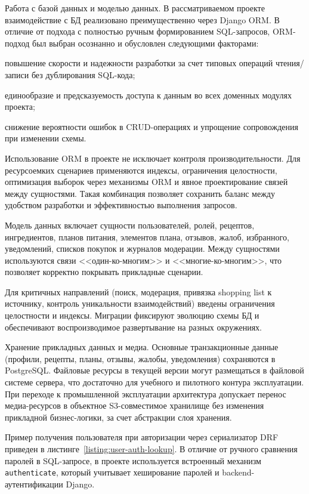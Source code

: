 Работа с базой данных и моделью данных. В рассматриваемом проекте взаимодействие с БД реализовано преимущественно через Django ORM. В отличие от подхода с полностью ручным формированием SQL-запросов, ORM-подход был выбран осознанно и обусловлен следующими факторами:
\begin{compactlist}
  \item повышение скорости и надежности разработки за счет типовых операций чтения/записи без дублирования SQL-кода;
  \item единообразие и предсказуемость доступа к данным во всех доменных модулях проекта;
  \item снижение вероятности ошибок в CRUD-операциях и упрощение сопровождения при изменении схемы.
\end{compactlist}

Использование ORM в проекте не исключает контроля производительности. Для ресурсоемких сценариев применяются индексы, ограничения целостности, оптимизация выборок через механизмы ORM и явное проектирование связей между сущностями. Такая комбинация позволяет сохранить баланс между удобством разработки и эффективностью выполнения запросов.

Модель данных включает сущности пользователей, ролей, рецептов, ингредиентов, планов питания, элементов плана, отзывов, жалоб, избранного, уведомлений, списков покупок и журналов модерации. Между сущностями используются связи <<один-ко-многим>> и <<многие-ко-многим>>, что позволяет корректно покрывать прикладные сценарии.

Для критичных направлений (поиск, модерация, привязка shopping list к источнику, контроль уникальности взаимодействий) введены ограничения целостности и индексы. Миграции фиксируют эволюцию схемы БД и обеспечивают воспроизводимое развертывание на разных окружениях.

Хранение прикладных данных и медиа. Основные транзакционные данные (профили, рецепты, планы, отзывы, жалобы, уведомления) сохраняются в PostgreSQL. Файловые ресурсы в текущей версии могут размещаться в файловой системе сервера, что достаточно для учебного и пилотного контура эксплуатации. При переходе к промышленной эксплуатации архитектура допускает перенос медиа-ресурсов в объектное S3-совместимое хранилище без изменения прикладной бизнес-логики, за счет абстракции слоя хранения.

Пример получения пользователя при авторизации через сериализатор DRF приведен в листинге~\ref{listing:user-auth-lookup}. В отличие от ручного сравнения паролей в SQL-запросе, в проекте используется встроенный механизм \texttt{authenticate}, который учитывает хеширование паролей и backend-аутентификации Django.

